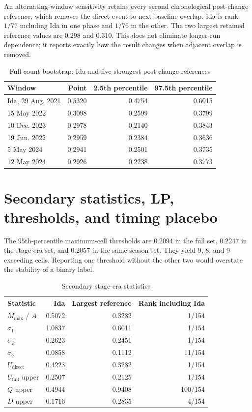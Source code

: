 \documentclass[11pt]{article}
\begin{document}
An alternating-window sensitivity retains every second chronological post-change reference, which removes the direct event-to-next-baseline overlap. Ida is rank $1/77$ including Ida in one phase and $1/76$ in the other. The two largest retained reference values are 0.298 and 0.310. This does not eliminate longer-run dependence; it reports exactly how the result changes when adjacent overlap is removed.

\begin{table}[t]
\centering
\caption{Full-count bootstrap: Ida and five strongest post-change references}
\label{tab:bootraw}
\begin{tabular}{@{}lrrr@{}}
\toprule
Window & Point & 2.5th percentile & 97.5th percentile \\
\midrule
Ida, 29 Aug. 2021 & 0.5320 & 0.4754 & 0.6015 \\
15 May 2022 & 0.3098 & 0.2599 & 0.3799 \\
10 Dec. 2023 & 0.2978 & 0.2140 & 0.3843 \\
19 Jun. 2022 & 0.2959 & 0.2384 & 0.3636 \\
5 May 2024 & 0.2941 & 0.2501 & 0.3735 \\
12 May 2024 & 0.2926 & 0.2238 & 0.3773 \\
\bottomrule
\end{tabular}
\end{table}

\section{Secondary statistics, LP, thresholds, and timing placebo}

The 95th-percentile maximum-cell thresholds are 0.2094 in the full set, 0.2247 in the stage-era set, and 0.2057 in the same-season set. They yield 9, 8, and 9 exceeding cells. Reporting one threshold without the other two would overstate the stability of a binary label.

\begin{table}[t]
\centering
\caption{Secondary stage-era statistics}
\label{tab:secondarysupp}
\begin{tabular}{@{}lrrr@{}}
\toprule
Statistic & Ida & Largest reference & Rank including Ida \\
\midrule
$M_{\max}$ / $A$ & 0.5072 & 0.3282 & 1/154 \\
$\sigma_1$ & 1.0837 & 0.6011 & 1/154 \\
$\sigma_2$ & 0.2623 & 0.2451 & 1/154 \\
$\sigma_3$ & 0.0858 & 0.1112 & 11/154 \\
$U_{\mathrm{direct}}$ & 0.4223 & 0.3282 & 1/154 \\
$U_{\mathrm{full}}$ upper & 0.2507 & 0.2125 & 1/154 \\
$Q$ upper & 0.4944 & 0.9408 & 100/154 \\
$D$ upper & 0.1716 & 0.2835 & 4/154 \\
\bottomrule
\end{tabular}
\end{table}
\end{document}

